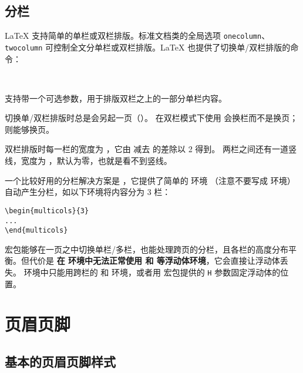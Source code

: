 \subsection{分栏}\label{subsec:columns}

\LaTeX{} 支持简单的单栏或双栏排版。标准文档类的全局选项 \texttt{onecolumn}、\texttt{twocolumn}
可控制全文分单栏或双栏排版。\LaTeX{} 也提供了切换单/双栏排版的命令：
\begin{command}
 \\
\end{command}

 支持带一个可选参数，用于排版双栏之上的一部分单栏内容。

切换单/双栏排版时总是会另起一页（）。
在双栏模式下使用  会换栏而不是换页； 则能够换页。

双栏排版时每一栏的宽度为 ，它由  减去  的差除以 2 得到。
两栏之间还有一道竖线，宽度为 ，默认为零，也就是看不到竖线。

一个比较好用的分栏解决方案是 ，它提供了简单的  环境
（注意不要写成  环境）自动产生分栏，如以下环境将内容分为 3 栏：
\begin{verbatim}
\begin{multicols}{3}
...
\end{multicols}
\end{verbatim}

 宏包能够在一页之中切换单栏/多栏，也能处理跨页的分栏，且各栏的高度分布平衡。但代价是%
\textbf{在  环境中无法正常使用  和  等浮动体环境}，它会直接让浮动体丢失。
 环境中只能用跨栏的  和  环境，或者用  宏包提供的 \texttt{H} 参数固定浮动体的位置。

\section{页眉页脚}\label{sec:pagestyle}

\subsection{基本的页眉页脚样式}\label{subsec:basic-pagesyle}

